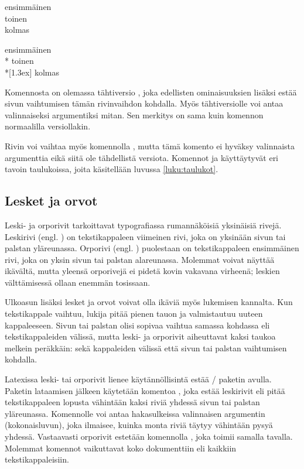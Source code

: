 \komentoi{\keno}
\begin{koodilohkosis}
  ensimmäinen \\ toinen \\[1.3ex] kolmas
\end{koodilohkosis}

\begin{tulossis}
  ensimmäinen \\* toinen \\*[1.3ex] kolmas
\end{tulossis}

Komennosta on olemassa tähtiversio \komentom{\keno *}, joka edellisten
ominaisuuksien lisäksi estää sivun vaihtumisen tämän rivinvaihdon
kohdalla. Myös tähtiversiolle voi antaa valinnaiseksi argumentiksi
mitan. Sen merkitys on sama kuin komennon normaalilla versiollakin.

Rivin voi vaihtaa myös komennolla , mutta tämä
komento ei hyväksy valinnaista argumenttia eikä siitä ole tähdellistä
versiota. Komennot  ja \komento{\keno} käyttäytyvät eri
tavoin taulukoissa, joita käsitellään luvussa \ref{luku:taulukot}.

\subsection{Lesket ja orvot}

Leski- ja orporivit tarkoittavat typografiassa rumannäköisiä yksinäisiä
rivejä. Leskirivi (engl. ) on tekstikappaleen viimeinen
rivi, joka on yksinään sivun tai palstan yläreunassa. Orporivi (engl.
) puolestaan on tekstikappaleen ensimmäinen rivi, joka
on yksin sivun tai palstan alareunassa. Molemmat voivat näyttää
ikävältä, mutta yleensä orporivejä ei pidetä kovin vakavana virheenä;
leskien välttämisessä ollaan enemmän tosissaan.

Ulkoasun lisäksi lesket ja orvot voivat olla ikäviä myös lukemisen
kannalta. Kun tekstikappale vaihtuu, lukija pitää pienen tauon ja
valmistautuu uuteen kappaleeseen. Sivun tai palstan olisi sopivaa
vaihtua samassa kohdassa eli tekstikappaleiden välissä, mutta leski- ja
orporivit aiheuttavat kaksi taukoa melkein peräkkäin: sekä kappaleiden
välissä että sivun tai palstan vaihtumisen kohdalla.

Latexissa leski- tai orporivit lienee käytännöllisintä estää
\-/ paketin avulla. Paketin lataamisen
jälkeen käytetään komentoa , joka estää leskirivit
eli pitää tekstikappaleen lopusta vähintään kaksi riviä yhdessä sivun
tai palstan yläreunassa. Komennolle voi antaa hakasulkeissa valinnaisen
argumentin (kokonaisluvun), joka ilmaisee, kuinka monta riviä täytyy
vähintään pysyä yhdessä. Vastaavasti orporivit estetään komennolla
, joka toimii samalla tavalla. Molemmat komennot
vaikuttavat koko dokumenttiin eli kaikkiin tekstikappaleisiin.

